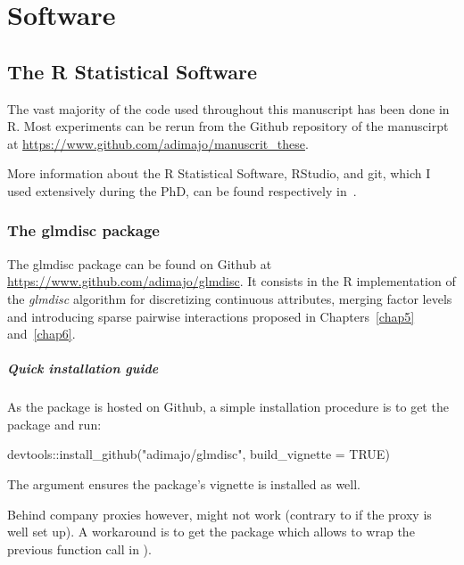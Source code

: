 \chapter{Software} \label{app2}

\section{The R Statistical Software}

The vast majority of the code used throughout this manuscript has been done in \textsf{R}. Most experiments can be rerun from the Github repository of the manuscirpt at \url{https://www.github.com/adimajo/manuscrit_these}.

More information about the \textsf{R} Statistical Software, RStudio, and git, which I used extensively during the PhD, can be found respectively in~\cite{prog_r_avance,gillespie_lovelace_2016,git_course}.

\subsection{The glmdisc package} \label{app2:glmdisc}

The glmdisc package can be found on Github at \url{https://www.github.com/adimajo/glmdisc}. It consists in the \textsf{R} implementation of the \textit{glmdisc} algorithm for discretizing continuous attributes, merging factor levels and introducing sparse pairwise interactions proposed in Chapters~\ref{chap5} and~\ref{chap6}.

\paragraph{Quick installation guide}

As the package is hosted on Github, a simple installation procedure is to get the  package and run:

\begin{rlisting}
devtools::install_github("adimajo/glmdisc", build_vignette = TRUE)
\end{rlisting}

The  argument ensures the package's vignette is installed as well.

Behind company proxies however,  might not work (contrary to  if the proxy is well set up). A workaround is to get the  package which allows to wrap the previous function call in ).

